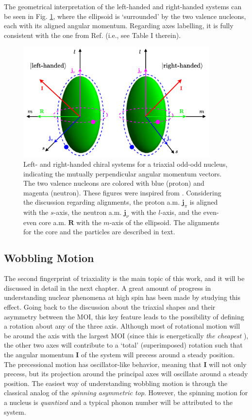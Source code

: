 The geometrical interpretation of the left-handed and right-handed systems can be seen in Fig. \ref{chiral-geometry}, where the ellipsoid is `surrounded' by the two valence nucleons, each with its aligned angular momentum. Regarding axes labelling, it is fully consistent with the one from Ref. \cite{frauendorf2001spontaneous} (i.e., see Table I therein).
\begin{figure}
    \centering
    \includegraphics[width=0.9\textwidth]{Chapters/Figures/chiral_handedness.pdf}
    \caption{Left- and right-handed chiral systems for a triaxial odd-odd nucleus, indicating the mutually perpendicular angular momentum vectors. The two valence nucleons are colored with blue (proton) and magenta (neutron). These figures were inspired from \cite{starosta2001chiral}. Considering the discussion regarding alignments, the proton a.m. $\mathbf{j}_\pi$ is aligned with the $s$-axis, the neutron a.m. $\mathbf{j}_\nu$ with the $l$-axis, and the even-even core a.m. $\mathbf{R}$ with the $m$-axis of the ellipsoid. The alignments for the core and the particles are described in text.}
    \label{chiral-geometry}
\end{figure}

\subsection{Wobbling Motion}

The second fingerprint of triaxiality is the main topic of this work, and it will be discussed in detail in the next chapter. A great amount of progress in understanding nuclear phenomena at high spin has been made by studying this effect. Going back to the discussion about the triaxial shapes and their asymmetry between the MOI, this key feature leads to the possibility of defining a rotation about any of the three axis. Although most of rotational motion will be around the axis with the largest MOI (since this is energetically \emph{the cheapest} \cite{bohr1954rotational}), the other two axes will contribute to a `total' (superimposed) rotation such that the angular momentum $\mathbf{I}$ of the system will precess around a steady position. The precessional motion has oscillator-like behavior, meaning that $\mathbf{I}$ will not only precess, but its projection around the principal axes will oscillate around a steady position. The easiest way of understanding wobbling motion is through the classical analog of the \emph{spinning asymmetric top}. However, the spinning motion for a nucleus is \emph{quantized} and a typical phonon number will be attributed to the system.

